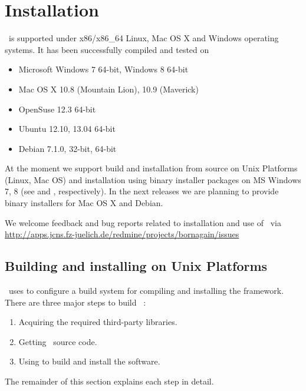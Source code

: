 

\newpage
\chapter{Installation} 

\BornAgain\ is supported under x86/x86\_64 Linux, Mac OS X and Windows operating systems. 
It has been successfully compiled and tested on
\begin{itemize}
\item Microsoft Windows 7 64-bit, Windows 8 64-bit
\item Mac OS X 10.8 (Mountain Lion), 10.9 (Maverick)
\item OpenSuse 12.3 64-bit
\item Ubuntu 12.10, 13.04 64-bit
\item Debian 7.1.0, 32-bit, 64-bit
\end{itemize}

At the moment we support build and installation from source on Unix Platforms 
(Linux, Mac OS) and
installation using binary installer packages on MS Windows 7, 8 (see
 and , respectively).
In the next releases we are planning to provide binary installers for 
Mac OS X and Debian.

We welcome feedback and bug reports related to
installation and use of \BornAgain\
 via \url{http://apps.jcns.fz-juelich.de/redmine/projects/bornagain/issues}


\section{Building and installing on Unix Platforms} 


\BornAgain\ uses  to configure a build system for compiling and installing the framework. There are three major steps to build \BornAgain\ :
\begin{enumerate}[1.]
\item Acquiring the required third-party libraries.
\item Getting \BornAgain\ source code.
\item Using  to build and install the software.
\end{enumerate}
The remainder of this section explains each step in detail.

